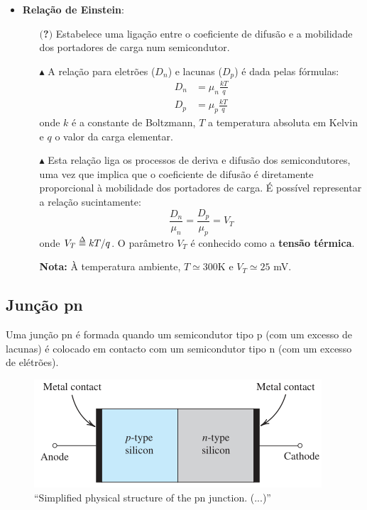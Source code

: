 \begin{itemize}[leftmargin=*]
    \item \textbf{Relação de Einstein}:
    \begin{itemize}
        \item[$($\textbf{?}$)$] Estabelece uma ligação entre o coeficiente de difusão e a mobilidade dos portadores de carga num semicondutor.
        \item[$\blacktriangle$] A relação para eletrões ($D_n$) e lacunas ($D_p$) é dada pelas fórmulas:
            \begin{align*}
                D_n &= \mu_n \frac{k T}{q} \\
                D_p &= \mu_p \frac{k T}{q}
            \end{align*}
        onde $k$ é a constante de Boltzmann, $T$ a temperatura absoluta em Kelvin e $q$ o valor da carga elementar.
        \item[$\blacktriangle$] Esta relação liga os processos de deriva e difusão dos semicondutores, uma vez que implica que o coeficiente de difusão é diretamente proporcional à mobilidade dos portadores de carga. É possível representar a relação sucintamente:
            $$
                \boxed{ \frac{D_n}{\mu_n} = \frac{D_p}{\mu_p} = V_T }
            $$
        onde $V_T \delequal kT/q$. O parâmetro $V_T$ é conhecido como a \textbf{tensão térmica}. 
        
        \textbf{Nota:} À temperatura ambiente, $T \simeq 300$K e $V_T \simeq 25$ mV.    
    \end{itemize}
\end{itemize}
    
\clearpage
\subsection[1.3 Junção pn]{\hspace*{0.075 em}\raisebox{0.2 em}{$\pmb{\drsh}$} Junção pn}
\label{subsec:pn-junction}

Uma junção pn é formada quando um semicondutor tipo p (com um excesso de lacunas) é colocado em contacto com um semicondutor tipo n (com um excesso de elétrões).

\begin{figure}[H]
    \centering
    \includegraphics{img/1/simplified-pn-junction.png}
    \caption{``Simplified physical structure of the pn junction. (...)''\cite{sedra-smith:microelectronic-circuits}}
    \label{fig:simplified-pn-junction}
\end{figure}

